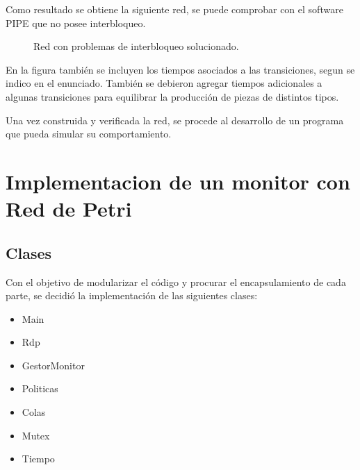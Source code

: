\documentclass[10pt, a4paper,notitlepage]{article}
\begin{document}
Como resultado se obtiene la siguiente red, se puede comprobar con el software PIPE que no posee interbloqueo.

\begin{figure}[H] %
	\caption{Red con problemas de interbloqueo solucionado.}
	\label{fig:red}
\end{figure}


En la figura también se incluyen los tiempos asociados a las transiciones, segun se indico en el enunciado. También se debieron agregar tiempos adicionales a algunas transiciones para equilibrar la producción de piezas de distintos tipos.

Una vez construida y verificada la red, se procede al desarrollo de un programa que pueda simular su comportamiento.



\section{Implementacion de un monitor con Red de Petri}
\subsection{Clases}
Con el objetivo de modularizar el código y procurar el encapsulamiento de cada parte, se decidió la implementación de las siguientes clases:

\begin{itemize}
	\item Main
	\item Rdp
	\item GestorMonitor
	\item Politicas
	\item Colas
	\item Mutex
	\item Tiempo
\end{itemize}
\end{document}
